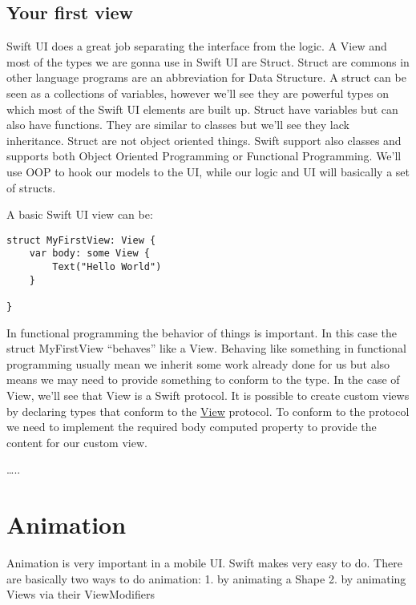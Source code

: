\documentclass[]{article}
\begin{document}
\hypertarget{your-first-view}{%
\subsection{Your first view}\label{your-first-view}}

Swift UI does a great job separating the interface from the logic. A
View and most of the types we are gonna use in Swift UI are Struct.
Struct are commons in other language programs are an abbreviation for
Data Structure. A struct can be seen as a collections of variables,
however we'll see they are powerful types on which most of the Swift UI
elements are built up. Struct have variables but can also have
functions. They are similar to classes but we'll see they lack
inheritance. Struct are not object oriented things. Swift support also
classes and supports both Object Oriented Programming or Functional
Programming. We'll use OOP to hook our models to the UI, while our logic
and UI will basically a set of structs.

A basic Swift UI view can be:

\begin{verbatim}
struct MyFirstView: View {
    var body: some View {
        Text("Hello World")
    }

}
\end{verbatim}

In functional programming the behavior of things is important. In this
case the struct MyFirstView ``behaves'' like a View. Behaving like
something in functional programming usually mean we inherit some work
already done for us but also means we may need to provide something to
conform to the type. In the case of View, we'll see that View is a Swift
protocol. It is possible to create custom views by declaring types that
conform to the
\href{https://developer.apple.com/documentation/swiftui/view}{View}
protocol. To conform to the protocol we need to implement the required
body computed property to provide the content for our custom view.

\ldots{}..

\hypertarget{animation}{%
\section{Animation}\label{animation}}

Animation is very important in a mobile UI. Swift makes very easy to do.
There are basically two ways to do animation: 1. by animating a Shape 2.
by animating Views via their ViewModifiers
\end{document}
